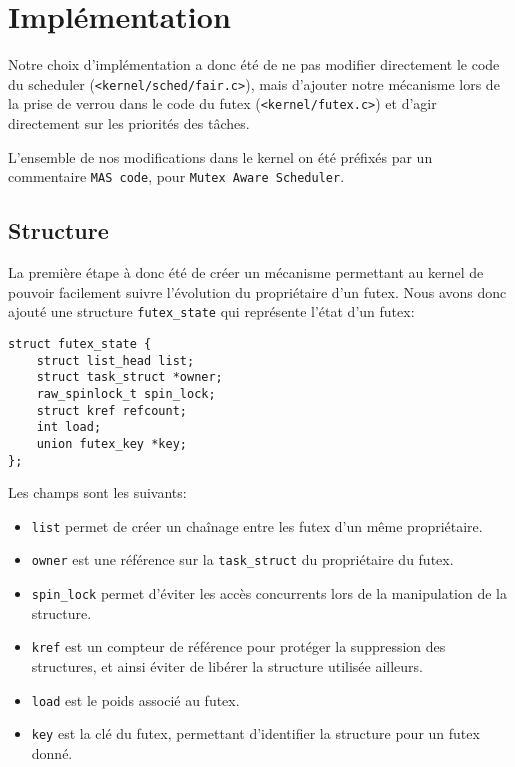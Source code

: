\section{Implémentation}

Notre choix d'implémentation a donc été de ne pas modifier directement le code du scheduler (\verb|<kernel/sched/fair.c>|), mais d'ajouter notre mécanisme lors de la prise de
verrou dans le code
du futex (\verb|<kernel/futex.c>|) et d'agir directement sur les priorités des tâches.

L'ensemble de nos modifications dans le kernel on été préfixés par un commentaire \verb|MAS code|, pour
\verb|Mutex Aware Scheduler|.

\subsection{Structure}

La première étape à donc été de créer un mécanisme permettant au kernel de pouvoir facilement
suivre l'évolution du propriétaire d'un futex.
Nous avons donc ajouté une structure \verb|futex_state| qui représente l'état d'un
futex:

\begin{lstlisting}[tabsize=4]
struct futex_state {
	struct list_head list;
	struct task_struct *owner;
	raw_spinlock_t spin_lock;
	struct kref refcount;
	int load;
	union futex_key *key;
};
\end{lstlisting}

Les champs sont les suivants:
\begin{itemize}
	\item \verb|list| permet de créer un chaînage entre les futex d'un même propriétaire.
	
	\item \verb|owner| est une référence sur la \verb|task_struct| du propriétaire du futex.
	
	\item \verb|spin_lock| permet d'éviter les accès concurrents lors de la manipulation de
	la structure.
	
	\item \verb|kref| est un compteur de référence pour protéger la suppression
	des structures, et ainsi éviter de libérer la structure utilisée ailleurs.
	
	\item \verb|load| est le poids associé au futex.
	
	\item \verb|key| est la clé du futex, permettant d'identifier la structure pour un 
	futex donné.
\end{itemize}
\hspace{1cm}

